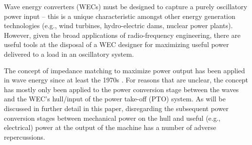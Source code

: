 \documentclass[lettersize,journal]{IEEEtran}
\begin{document}


Wave energy converters (WECs) must be designed to capture a purely oscillatory power input -- this is a unique characteristic amongst other energy generation technologies (e.g., wind turbines, hydro-electric dams, nuclear power plants).
However, given the broad applications of radio-frequency engineering, there are useful tools at the disposal of a WEC designer for maximizing useful power delivered to a load in an oscillatory system.

The concept of impedance matching to maximize power output has been applied in wave energy since at least the 1970s \cite{Falnes:1980aa}.
For reasons that are unclear, the concept has mostly only been applied to the power conversion stage between the waves and the WEC's hull/input of the power take-off (PTO) system.
As will be discussed in further detail in this paper, disregarding the subsequent power conversion stages between mechanical power on the hull and useful (e.g., electrical) power at the output of the machine has a number of adverse repercussions.
\end{document}

